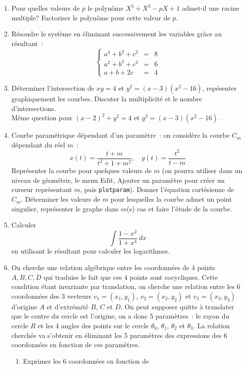 \documentclass[a4paper,11pt]{book}
\begin{document}
\begin{giacjshere}
\begin{enumerate}
\item Pour quelles valeurs de $p$ le polyn\^ome $X^5+X^3-pX+1$ admet-il
une racine multiple? Factoriser le polyn\^ome pour cette valeur de $p$.
\item R\'esoudre le syst\`eme en \'eliminant successivement les
variables gr\^ace au r\'esultant~:
\[
\left\{\begin{array}{rcl}
a^{3}+b^{3}+c^{3} & = & 8 \\
a^{2}+b^{2}+c^{2} & = & 6 \\
a+b+2c & = & 4
\end{array}\right.
\]
\item D\'eterminer l'intersection de $xy=4$ et $ y^2=(x-3)(x^2-16)$,
rep\'esenter graphiquement les courbes. Discuter la multiplicit\'e
et le nombre d'intersections.\\
M\^eme question pour $(x-2)^2+y^2=4$ et $y^2=(x-3)(x^2-16)$.
\item Courbe param\'etrique d\'ependant d'un param\`etre~:
on consid\`ere la courbe $C_m$ d\'ependant du r\'eel $m$~:
$$ x(t)=\frac{t+m}{t^2+1+m^2}, \quad y(t)=\frac{t^2}{t-m}$$
Repr\'esenter la courbe pour quelques valeurs de $m$ (on pourra
utiliser dans un niveau de g\'eom\'etrie, le menu Edit, Ajouter un
param\`etre pour cr\'eer un curseur repr\'esentant $m$, puis 
\verb|plotparam|). Donner l'\'equation cart\'esienne de $C_m$.
D\'eterminer les valeurs de $m$ pour lesquelles
la courbe admet un point singulier, repr\'esenter le graphe dans ce(s)
cas et faire l'\'etude de la courbe.
\item Calculer 
\[ \int \frac{1-x^2}{1+x^4} \ dx \]
en utilisant le r\'esultant pour calculer les logarithmes.
\item
On cherche une relation alg\'ebrique entre les coordonn\'ees de 4 points
$A,B,C,D$ qui traduise le fait que ces 4 points sont cocycliques. Cette
condition \'etant invariante par translation, on cherche une
relation entre les 6 coordonn\'ees des 3 vecteurs $v_1=(x_1,y_1)$, 
$v_2=(x_2,y_2)$ et $v_3=(x_3,y_3)$ 
d'origine $A$ et d'extr\'emit\'e $B$, $C$ et $D$.
On peut supposer quitte \`a translater que le centre du cercle est
l'origine, on a donc 5 param\`etres~: le rayon du cercle $R$ et les
4 angles des points sur le cercle $\theta_0$, $\theta_1$, $\theta_2$ et
$\theta_3$. La relation cherch\'ee va s'obtenir en \'eliminant les
5 param\`etres des expressions des 6 coordonn\'ees en fonction de
ces param\`etres.
\begin{enumerate}
\item Exprimer les 6 coordonn\'ees en fonction de 

\end{enumerate}
\end{enumerate}
\end{giacjshere}
\end{document}
